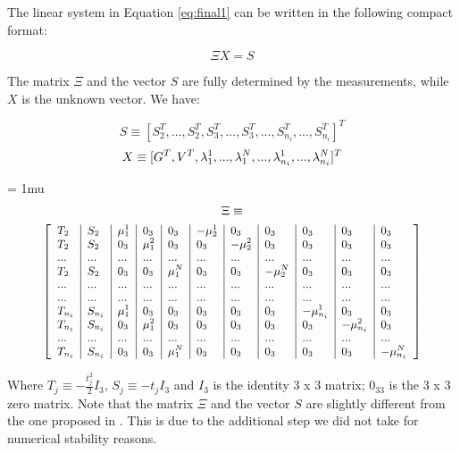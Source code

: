 \documentclass[letterpaper, 10 pt, conference]{ieeeconf}  %
\begin{document}
The linear system in Equation \ref{eq:final1} can be written in the following compact format:

\begin{equation}
\label{eq:mat1} \tag{9}
\Xi X = S
\end{equation}

The matrix $\Xi$ and the vector $S$ are fully determined by the measurements, while $X$ is the unknown vector.
We have:

\[
S \equiv [S_2^T, ...,S_2^T, S_3^T,...,S_3^T,...,S_{n_i}^T,...,S_{n_i}^T]^T
\]
\[
X \equiv [ G^T, V^T, \lambda_1^1, ..., \lambda_1^N, ..., \lambda_{n_i}^1, ..., \lambda_{n_i}^N]^T \\
\]

{
\arraycolsep=3pt %
\medmuskip = 1mu %
\begin{multline*}
  \Xi \equiv \\
      {
        \footnotesize
        \left[
          \begin{array}{l|l|l|l|l|l|l|l|l|l|l}
            T_2 & S_2 & \mu_1^1 & 0_3 & 0_3 & -\mu_2^1 & 0_3 & 0_3 & 0_3 & 0_3 & 0_3 \\
            T_2 & S_2 & 0_3 & \mu_1^2 & 0_3 & 0_3 & -\mu_2^2 & 0_3 & 0_3 & 0_3 & 0_3 \\
            ... & ... & ... & ... & ... & ... & ... & ... & ... & ... & ... \\
            T_2 & S_2 & 0_3 & 0_3 & \mu_1^N & 0_3 & 0_3 & -\mu_2^N & 0_3 & 0_3 & 0_3 \\
            ... & ... & ... & ... & ... & ... & ... & ... & ... & ... & ... \\
            ... & ... & ... & ... & ... & ... & ... & ... & ... & ... & ... \\
            T_{n_i} & S_{n_i} & \mu_1^1 & 0_3 & 0_3 & 0_3 & 0_3 & 0_3 & -\mu_{n_i}^1 & 0_3 & 0_3 \\
            T_{n_i} & S_{n_i} & 0_3 & \mu_1^2 & 0_3 & 0_3 & 0_3 & 0_3 & 0_3 & -\mu_{n_i}^2 & 0_3 \\
            ... & ... & ... & ... & ... & ... & ... & ... & ... & ... & ... \\
            T_{n_i} & S_{n_i} & 0_3 & 0_3 & \mu_1^N & 0_3 & 0_3 & 0_3 & 0_3 & 0_3 & -\mu_{n_i}^N
          \end{array}
          \right]
      }
\end{multline*}
}

Where $T_j \equiv - \frac{t^2_j}{2} I_3$, $S_j \equiv -t_j I_3$ and $I_3$ is the identity 3 x 3 matrix; $0_{33}$ is the 3 x 3 zero matrix.
Note that the matrix $\Xi$ and the vector $S$ are slightly different from the one proposed in \cite{Martinelli2014}.
This is due to the additional step we did not take for numerical stability reasons.
\end{document}
